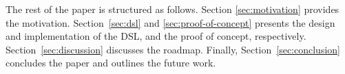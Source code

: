 The rest of the paper is structured as follows. 
Section \ref{sec:motivation} provides the motivation.
Section~\ref{sec:dsl} and \ref{sec:proof-of-concept}  presents the design and implementation of the DSL, and the proof of concept, respectively.
Section~\ref{sec:discussion} discusses the roadmap.
Finally, Section~\ref{sec:conclusion} concludes the paper and outlines the future work.